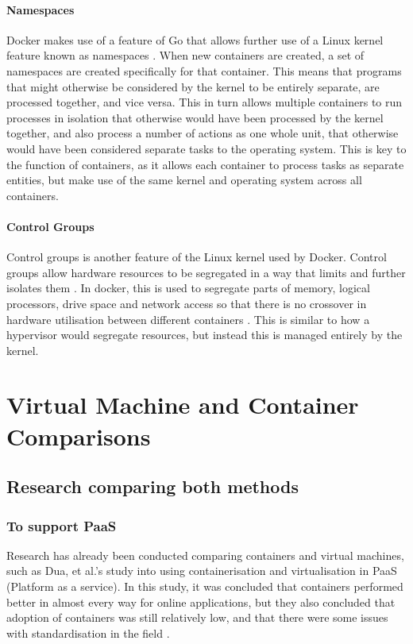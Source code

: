 \subsubsection{Namespaces}
\label{subsec:Namespaces}
Docker makes use of a feature of Go that allows further use of a Linux kernel feature known as namespaces \citep[Section: Namespaces]{DockerOverview}.
When new containers are created, a set of namespaces are created specifically for that container. This means that programs that might otherwise be considered by the kernel to be entirely separate, are processed together, and vice versa. This in turn allows multiple containers to run processes in isolation that otherwise would have been processed by the kernel together, and also process a number of actions as one whole unit, that otherwise would have been considered separate tasks to the operating system. This is key to the function of containers, as it allows each container to process tasks as separate entities, but make use of the same kernel and operating system across all containers.

\subsubsection{Control Groups}
\label{subsec:ControlGroups}
Control groups is another feature of the Linux kernel used by Docker. Control groups allow hardware resources to be segregated in a way that limits and further isolates them \citep{corbetControlGroups}. In docker, this is used to segregate parts of memory, logical processors, drive space and network access so that there is no crossover in hardware utilisation between different containers \citep{DockerSecurity}. This is similar to how a hypervisor would segregate resources, but instead this is managed entirely by the kernel.

\chapter{Virtual Machine and Container Comparisons}
\section{Research comparing both methods}
\label{ComparisonStudies}
\subsection{To support PaaS}
Research has already been conducted comparing containers and virtual machines, such as Dua, et al.'s study into using containerisation and virtualisation in PaaS (Platform as a service)\citep{dua14}. In this study, it was concluded that containers performed better in almost every way for online applications, but they also concluded that adoption of containers was still relatively low, and that there were some issues with standardisation in the field \citep{dua14}.

